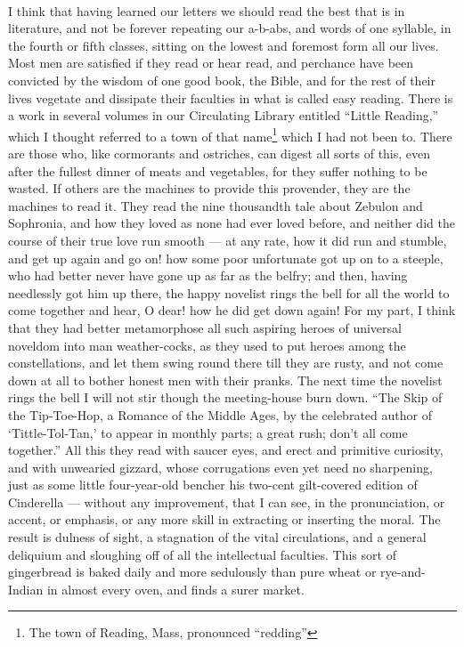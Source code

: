 \documentclass[letterpaper,12pt]{article}
\begin{document}
\paragraph{}
I think that having learned our letters we should read the best that is in
literature, and not be forever repeating our a-b-abs, and words of one syllable,
in the fourth or fifth classes, sitting on the lowest and foremost form all our
lives. Most men are satisfied if they read or hear read, and perchance have been
convicted by the wisdom of one good book, the Bible, and for the rest of their
lives vegetate and dissipate their faculties in what is called easy reading.
There is a work in several volumes in our Circulating Library entitled
\enquote{Little Reading,} which I thought referred to a town of that
name\footnote{The town of Reading, Mass, pronounced \enquote{redding}} which I
had not been to. There are those who, like cormorants and ostriches, can digest
all sorts of this, even after the fullest dinner of meats and vegetables, for
they suffer nothing to be wasted. If others are the machines to provide this
provender, they are the machines to read it. They read the nine thousandth tale
about Zebulon and Sophronia, and how they loved as none had ever loved before,
and neither did the course of their true love run smooth --- at any rate, how it
did run and stumble, and get up again and go on! how some poor unfortunate got
up on to a steeple, who had better never have gone up as far as the belfry; and
then, having needlessly got him up there, the happy novelist rings the bell for
all the world to come together and hear, O dear! how he did get down again! For
my part, I think that they had better metamorphose all such aspiring heroes of
universal noveldom into man weather-cocks, as they used to put heroes among the
constellations, and let them swing round there till they are rusty, and not come
down at all to bother honest men with their pranks. The next time the novelist
rings the bell I will not stir though the meeting-house burn down. \enquote{The
    Skip of the Tip-Toe-Hop, a Romance of the Middle Ages, by the celebrated
    author of \enquote*{Tittle-Tol-Tan,} to appear in monthly parts; a great
    rush; don't all come together.} All this they read with saucer eyes, and
erect and primitive curiosity, and with unwearied gizzard, whose corrugations
even yet need no sharpening, just as some little four-year-old bencher his
two-cent gilt-covered edition of Cinderella --- without any improvement, that I
can see, in the pronunciation, or accent, or emphasis, or any more skill in
extracting or inserting the moral. The result is dulness of sight, a stagnation
of the vital circulations, and a general deliquium and sloughing off of all the
intellectual faculties. This sort of gingerbread is baked daily and more
sedulously than pure wheat or rye-and-Indian in almost every oven, and finds a
surer market.
\end{document}
